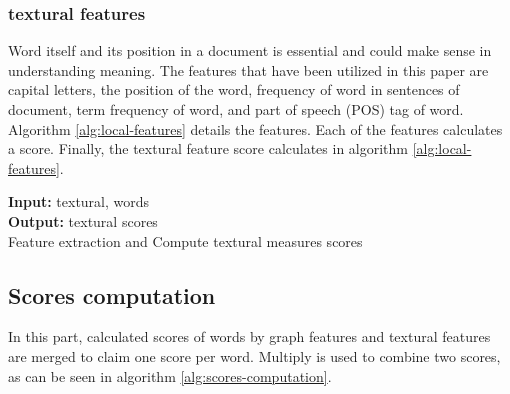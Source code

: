 \documentclass[3p]{elsarticle}
\begin{document}
\subsubsection{textural features}
Word itself and its position in a document is essential and could make sense in understanding meaning. The features that have been utilized in this paper are capital letters, the position of the word, frequency of word in sentences of document, term frequency of word, and part of speech (POS) tag of word. Algorithm \ref{alg:local-features} details the features. Each of the features calculates a score. Finally, the textural feature score calculates in algorithm \ref{alg:local-features}. 

\begin{algorithm}
    \SetAlgoLined
    \textbf{Input:} textural, words \\
    
    \textbf{Output:} textural scores\\
  
    \caption{Feature extraction and Compute textural measures scores}
    \label{alg:local-features}
\end{algorithm}
\subsection{Scores computation}
In this part, calculated scores of words by graph features and textural features are merged to claim one score per word. Multiply is used to combine two scores, as can be seen in algorithm \ref{alg:scores-computation}.
\end{document}
